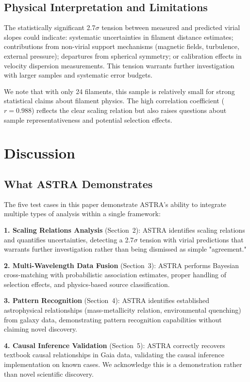 \documentclass[usenatbib]{rasti}
\begin{document}
\subsection{Physical Interpretation and Limitations}

The statistically significant 2.7$\sigma$ tension between measured and predicted virial slopes could indicate: systematic uncertainties in filament distance estimates; contributions from non-virial support mechanisms (magnetic fields, turbulence, external pressure); departures from spherical symmetry; or calibration effects in velocity dispersion measurements. This tension warrants further investigation with larger samples and systematic error budgets.

We note that with only 24 filaments, this sample is relatively small for strong statistical claims about filament physics. The high correlation coefficient ($r = 0.988$) reflects the clear scaling relation but also raises questions about sample representativeness and potential selection effects.

\section{Discussion}

\subsection{What ASTRA Demonstrates}

The five test cases in this paper demonstrate ASTRA's ability to integrate multiple types of analysis within a single framework:

\textbf{1. Scaling Relations Analysis} (Section~2): ASTRA identifies scaling relations and quantifies uncertainties, detecting a 2.7$\sigma$ tension with virial predictions that warrants further investigation rather than being dismissed as simple "agreement."

\textbf{2. Multi-Wavelength Data Fusion} (Section~3): ASTRA performs Bayesian cross-matching with probabilistic association estimates, proper handling of selection effects, and physics-based source classification.

\textbf{3. Pattern Recognition} (Section~4): ASTRA identifies established astrophysical relationships (mass-metallicity relation, environmental quenching) from galaxy data, demonstrating pattern recognition capabilities without claiming novel discovery.

\textbf{4. Causal Inference Validation} (Section~5): ASTRA correctly recovers textbook causal relationships in Gaia data, validating the causal inference implementation on known cases. We acknowledge this is a demonstration rather than novel scientific discovery.
\end{document}
